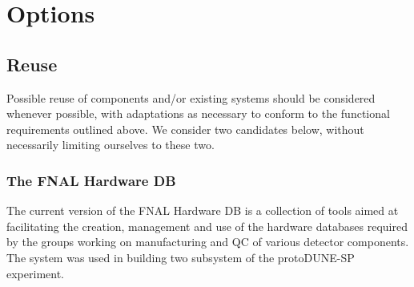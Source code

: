 \documentclass[pdftex,12pt,letter]{article}
\begin{document}

\section{Options}
\label{options}

\subsection{Reuse}
Possible reuse of components and/or existing systems should be considered whenever possible,
with adaptations as necessary to conform to the functional requirements outlined above. We consider
two candidates below, without necessarily limiting ourselves to these two.

\subsubsection{The FNAL Hardware DB}

The current version of the FNAL Hardware DB \cite{hardwareDB} is a collection of tools aimed at facilitating the creation,
management and use of the hardware databases required by the groups working on manufacturing and QC of 
various detector
components. The system was used in building two subsystem of the protoDUNE-SP experiment.
\end{document}
